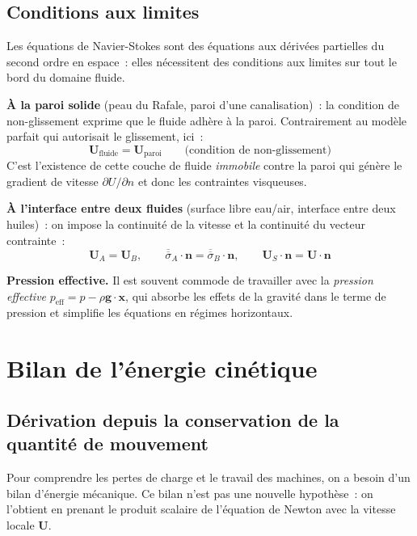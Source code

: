 \documentclass[11pt,a4paper]{report}
\newcommand{\ten}[1]{\overline{\overline{#1}}}   %
\begin{document}
\subsection{Conditions aux limites}

Les équations de Navier-Stokes sont des équations aux dérivées partielles du second
ordre en espace~: elles nécessitent des conditions aux limites sur tout le bord du
domaine fluide.

\medskip
\noindent\textbf{À la paroi solide} (peau du Rafale, paroi d'une canalisation)~:
la condition de non-glissement exprime que le fluide adhère à la paroi.
Contrairement au modèle parfait qui autorisait le glissement, ici~:
\[
    \bm{U}_\text{fluide} = \bm{U}_\text{paroi}
    \qquad\text{(condition de non-glissement)}
\]
C'est l'existence de cette couche de fluide \emph{immobile} contre la paroi qui
génère le gradient de vitesse $\partial U/\partial n$ et donc les contraintes
visqueuses.

\medskip
\noindent\textbf{À l'interface entre deux fluides} (surface libre eau/air, interface
entre deux huiles)~: on impose la continuité de la vitesse et la continuité du
vecteur contrainte~:
\[
    \bm{U}_A = \bm{U}_B,
    \qquad
    \ten{\sigma}_A\cdot\bm{n} = \ten{\sigma}_B\cdot\bm{n},
    \qquad
    \bm{U}_S\cdot\bm{n} = \bm{U}\cdot\bm{n}
\]

\medskip
\noindent\textbf{Pression effective.} Il est souvent commode de travailler avec la
\emph{pression effective} $p_\text{eff}=p-\rho\bm{g}\cdot\bm{x}$, qui absorbe
les effets de la gravité dans le terme de pression et simplifie les équations en
régimes horizontaux.

\section{Bilan de l'énergie cinétique}

\subsection{Dérivation depuis la conservation de la quantité de mouvement}

Pour comprendre les pertes de charge et le travail des machines, on a besoin d'un
bilan d'énergie mécanique. Ce bilan n'est pas une nouvelle hypothèse~: on l'obtient
en prenant le produit scalaire de l'équation de Newton avec la vitesse locale $\bm{U}$.
\end{document}

